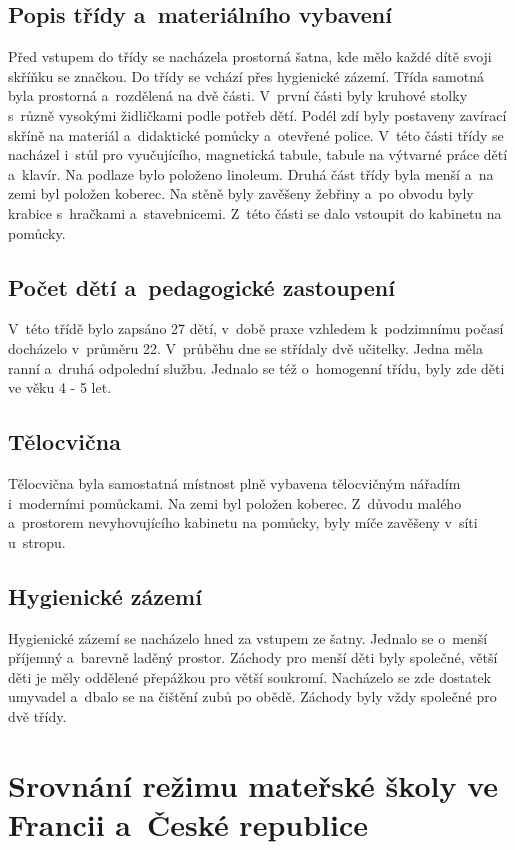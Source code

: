 		\subsection{Popis třídy a~materiálního vybavení}

			Před vstupem do třídy se nacházela prostorná šatna, kde mělo každé dítě svoji skříňku se značkou. Do třídy se vchází přes hygienické zázemí. Třída samotná byla prostorná a~rozdělená na dvě části. V~první části byly kruhové stolky s~různě vysokými židličkami podle potřeb dětí. Podél zdí byly postaveny zavírací skříně na materiál a~didaktické pomůcky a~otevřené police. V~této části třídy se nacházel i~stůl pro vyučujícího, magnetická tabule, tabule na výtvarné práce dětí a~klavír. Na podlaze bylo položeno linoleum. Druhá část třídy byla menší a~na zemi byl položen koberec. Na stěně byly zavěšeny žebřiny a~po obvodu byly krabice s~hračkami a~stavebnicemi. Z~této části se dalo vstoupit do kabinetu na pomůcky.

		\subsection{Počet dětí a~pedagogické zastoupení}

			V~této třídě bylo zapsáno 27 dětí, v~době praxe vzhledem k~podzimnímu počasí docházelo v~průměru 22. V~průběhu dne se střídaly dvě učitelky. Jedna měla ranní a~druhá odpolední službu.
			Jednalo se též o~homogenní třídu, byly zde děti ve věku 4 - 5 let.
		
		\subsection{Tělocvična}
			Tělocvična byla samostatná místnost plně vybavena tělocvičným nářadím i~moderními pomůckami. Na zemi byl položen koberec. Z~důvodu malého a~prostorem nevyhovujícího kabinetu na pomůcky,  byly míče zavěšeny v~síti u~stropu.

		\subsection{Hygienické zázemí}
			Hygienické zázemí se nacházelo hned za vstupem ze šatny. Jednalo se o~menší příjemný a~barevně laděný prostor. Záchody pro menší děti byly společné, větší děti je měly oddělené přepážkou pro větší soukromí. Nacházelo se zde dostatek umyvadel a~dbalo se na čištění zubů po obědě. Záchody byly vždy společné pro dvě třídy. 

\section{Srovnání režimu mateřské školy ve Francii a~České republice} 
\label{srovnani} 

